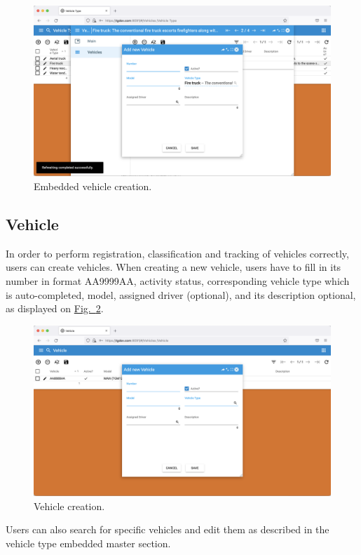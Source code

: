     \begin{figure}[!htbp]
	\centering
	\includegraphics[width=0.95\linewidth]{sections/vehicles/images/26.png}
	\caption{Embedded vehicle creation.}\label{sections/vehicles/images/26}
	\end{figure}

\newpage	
\subsection{Vehicle}
In order to perform registration, classification and tracking of vehicles correctly, users can create vehicles. When creating a new vehicle, users have to fill in its number in format AA9999AA, activity status, corresponding vehicle type which is auto-completed, model, assigned driver (optional), and its description optional, as displayed on \hyperref[sections/vehicles/images/27]{Fig.~\ref*{sections/vehicles/images/27}}.

    \begin{figure}[!htbp]
	\centering
	\includegraphics[width=0.95\linewidth]{sections/vehicles/images/27.png}
	\caption{Vehicle creation.}\label{sections/vehicles/images/27}
	\end{figure}

Users can also search for specific vehicles and edit them as described in the vehicle type embedded master section.